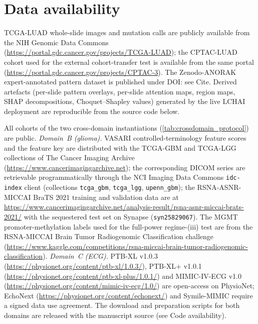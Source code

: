 \section*{Data availability}
TCGA-LUAD whole-slide images and mutation calls are publicly
available from the NIH Genomic Data Commons
(\url{https://portal.gdc.cancer.gov/projects/TCGA-LUAD}); the
CPTAC-LUAD cohort used for the external cohort-transfer test is
available from the same portal
(\url{https://portal.gdc.cancer.gov/projects/CPTAC-3}).
The Zenodo-ANORAK expert-annotated pattern dataset is published
under DOI: see Cite.\cite{ANORAKZenodo}
Derived artefacts (per-slide pattern overlays, per-slide attention
maps, region maps, SHAP decompositions, Choquet--Shapley values)
generated by the live LCHAI deployment are reproducible from the
source code below.

All cohorts of the two cross-domain instantiations
(\cref{tab:crossdomain_protocol}) are public.
\emph{Domain~B (glioma).}
VASARI controlled-terminology feature scores and the feature key are
distributed with the TCGA-GBM and TCGA-LGG collections of The Cancer
Imaging Archive (\url{https://www.cancerimagingarchive.net});
the corresponding DICOM series are retrievable programmatically
through the NCI Imaging Data Commons \texttt{idc-index} client
(collections \texttt{tcga\_gbm}, \texttt{tcga\_lgg},
\texttt{upenn\_gbm}); the RSNA-ASNR-MICCAI BraTS 2021 training and
validation data are at
\url{https://www.cancerimagingarchive.net/analysis-result/rsna-asnr-miccai-brats-2021/}
with the sequestered test set on Synapse
(\texttt{syn25829067}).\cite{baid2021brats}
The MGMT promoter-methylation labels used for the full-power
regime-(iii) test are from the RSNA-MICCAI Brain Tumor Radiogenomic
Classification challenge
(\url{https://www.kaggle.com/competitions/rsna-miccai-brain-tumor-radiogenomic-classification}).
\emph{Domain~C (ECG).}
PTB-XL v1.0.3 (\url{https://physionet.org/content/ptb-xl/1.0.3/}),
PTB-XL$+$ v1.0.1
(\url{https://physionet.org/content/ptb-xl-plus/1.0.1/}) and
MIMIC-IV-ECG v1.0
(\url{https://physionet.org/content/mimic-iv-ecg/1.0/}) are
open-access on PhysioNet; EchoNext
(\url{https://physionet.org/content/echonext/}) and Symile-MIMIC
require a signed data use agreement.
The download and preparation scripts for both domains are released
with the manuscript source (see Code availability).


